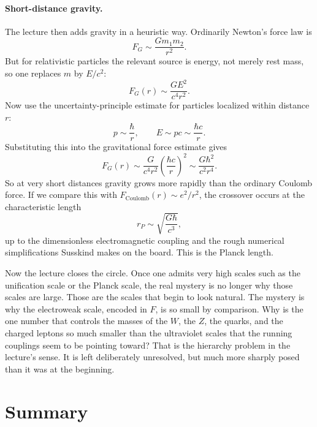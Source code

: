 \paragraph{Short-distance gravity.}
The lecture then adds gravity in a heuristic way. Ordinarily Newton's force law is
\begin{equation}
F_G \sim \frac{Gm_1m_2}{r^2}.
\end{equation}
But for relativistic particles the relevant source is energy, not merely rest mass, so one replaces \(m\) by \(E/c^2\):
\begin{equation}
F_G(r)\sim \frac{GE^2}{c^4r^2}.
\end{equation}
Now use the uncertainty-principle estimate for particles localized within distance \(r\):
\begin{equation}
p\sim \frac{\hbar}{r},
\qquad
E\sim pc\sim \frac{\hbar c}{r}.
\end{equation}
Substituting this into the gravitational force estimate gives
\begin{equation}
F_G(r)\sim \frac{G}{c^4r^2}\left(\frac{\hbar c}{r}\right)^2
\sim
\frac{G\hbar^2}{c^2r^4}.
\end{equation}
So at very short distances gravity grows more rapidly than the ordinary Coulomb force. If we compare this with \(F_{\mathrm{Coulomb}}(r)\sim e^2/r^2\), the crossover occurs at the characteristic length
\begin{equation}
r_P \sim \sqrt{\frac{G\hbar}{c^3}},
\end{equation}
up to the dimensionless electromagnetic coupling and the rough numerical simplifications Susskind makes on the board. This is the Planck length.

Now the lecture closes the circle. Once one admits very high scales such as the unification scale or the Planck scale, the real mystery is no longer why those scales are large. Those are the scales that begin to look natural. The mystery is why the electroweak scale, encoded in \(F\), is so small by comparison. Why is the one number that controls the masses of the \(W\), the \(Z\), the quarks, and the charged leptons so much smaller than the ultraviolet scales that the running couplings seem to be pointing toward? That is the hierarchy problem in the lecture's sense. It is left deliberately unresolved, but much more sharply posed than it was at the beginning.

\section{Summary}

